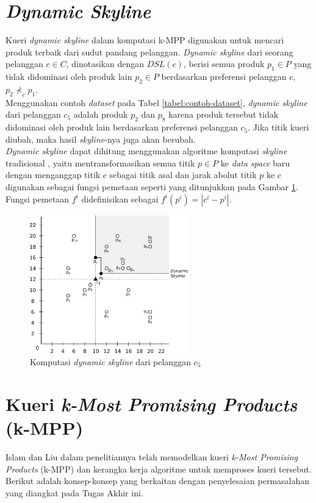 \section{\textit{Dynamic Skyline}}
\tab Kueri \textit{dynamic skyline} dalam komputasi k-MPP digunakan untuk mencari produk terbaik dari sudut pandang pelanggan. \textit{Dynamic skyline} \cite{dynamic-skyline} dari seorang pelanggan $c \in C$, dinotasikan dengan $DSL(c)$, berisi semua produk $p_1 \in P$ yang tidak didominasi oleh produk lain $p_2 \in P$ berdasarkan preferensi pelanggan $c$, $p_2 \nprec_c p_1$.\\
\tab Menggunakan contoh \textit{dataset} pada Tabel \ref{tabel:contoh-dataset}, \textit{dynamic skyline} dari pelanggan $c_5$ adalah produk $p_2$ dan $p_8$ karena produk tersebut tidak didominasi oleh produk lain berdasarkan preferensi pelanggan $c_5$. Jika titik kueri diubah, maka hasil \textit{skyline}-nya juga akan berubah.\\
\tab \textit{Dynamic skyline} dapat dihitung menggunakan algoritme komputasi \textit{skyline} tradisional \cite{skyline}, yaitu mentransformasikan semua titik $p \in P$ ke \textit{data space} baru dengan menganggap titik $c$ sebagai titik asal dan jarak abolut titik $p$ ke $c$ digunakan sebagai fungsi pemetaan seperti yang ditunjukkan pada Gambar \ref{figure:dsl-c5}. Fungsi pemetaan $f^i$ didefinisikan sebagai $f^i (p^i) = |c^i-p^i|$.

\begin{figure}[H]
	\centerline {
		\includegraphics[height=6cm]{bab2/img/dsl.png}
	}
	\caption{Komputasi \textit{dynamic skyline} dari pelanggan $c_5$}
	\label{figure:dsl-c5}
\end{figure}

\section{Kueri \textit{k-Most Promising Products} (k-MPP)}
\tab Islam dan Liu dalam penelitiannya \cite{kmpp} telah memodelkan kueri \textit{k-Most Promising Products} (k-MPP) dan kerangka kerja algoritme untuk memproses kueri tersebut. Berikut adalah konsep-konsep yang berkaitan dengan penyelesaian permasalahan yang diangkat pada Tugas Akhir ini. 


